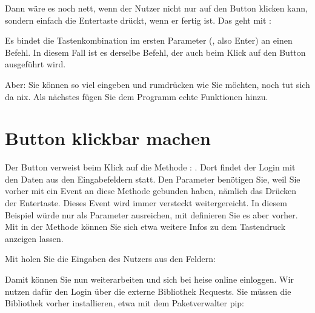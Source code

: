 Dann wäre es noch nett, wenn der Nutzer nicht nur auf den Button klicken kann, sondern einfach die Entertaste drückt, wenn er fertig ist. Das geht mit :

\medskip


\medskip

Es bindet die Tastenkombination im ersten Parameter (, also Enter) an einen Befehl. In diesem Fall ist es derselbe Befehl, der auch beim Klick auf den Button ausgeführt wird.

Aber: Sie können so viel eingeben und rumdrücken wie Sie möchten, noch tut sich da nix. Als nächstes fügen Sie dem Programm echte Funktionen hinzu.

\section{Button klickbar machen}

Der Button verweist beim Klick auf die Methode : . Dort findet der Login mit den Daten aus den Eingabefeldern statt. Den Parameter  benötigen Sie, weil Sie vorher mit  ein Event an diese Methode gebunden haben, nämlich das Drücken der Entertaste. Dieses Event wird immer versteckt weitergereicht. In diesem Beispiel würde nur  als Parameter ausreichen, mit  definieren Sie es aber vorher. Mit  in der Methode können Sie sich etwa weitere Infos zu dem Tastendruck anzeigen lassen.

Mit  holen Sie die Eingaben des Nutzers aus den Feldern:

\medskip



\medskip

Damit können Sie nun weiterarbeiten und sich bei heise online einloggen. Wir nutzen dafür den Login über die externe Bibliothek Requests. Sie müssen die Bibliothek vorher installieren, etwa mit dem Paketverwalter pip:

\medskip


\medskip


